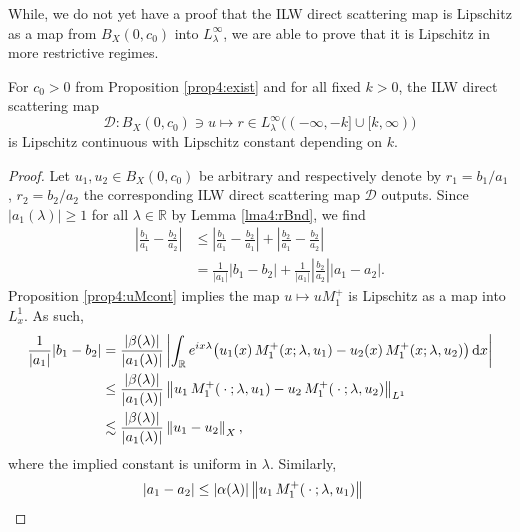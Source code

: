 \documentclass[../dissertation.tex]{subfiles}
\begin{document}
While, we do not yet have a proof that the ILW direct
scattering map is Lipschitz as a map from $B_X(0, c_0)$ into 
$L_\lambda^\infty$, we are able to prove that it is Lipschitz in 
more restrictive regimes.  


\begin{thm}\label{thm4:DlipR}
	For $c_0>0$ from Proposition \ref{prop4:exist} and for all fixed 
	$k > 0$, the ILW direct scattering map 
	\[
		\mathscr D: B_X(0, c_0) \ni u \mapsto r \in
			L_\lambda^\infty\big((-\infty,-k]\cup[k,\infty)\big)
	\] 
	is Lipschitz continuous with Lipschitz constant depending on $k$. 
\end{thm}
\begin{proof}
	Let $u_1, u_2 \in B_X(0, c_0)$ be arbitrary and respectively denote by 
	$r_1 = b_1 / a_1$, $r_2 = b_2 / a_2$ the corresponding ILW direct scattering
	map $\mathscr D$ outputs. Since $|a_1(\lambda)| \geq 1$ for all $\lambda \in \mathbb R$
	by Lemma \ref{lma4:rBnd}, we find 
	\begin{align}\label{eq4:DlipPnT}
		\left| \frac{b_1}{a_1} - \frac{b_2}{a_2} \right|
			&\leq \left|\frac{b_1}{a_1} - \frac{b_2}{a_1}\right|
				+ \left|\frac{b_2}{a_1} - \frac{b_2}{a_2}\right| \\
			&= \frac{1}{|a_1|} |b_1 - b_2| 
				+ \frac{1}{|a_1|} 
					\left|\frac{b_2}{a_2}\right| 
					\left| a_1 - a_2 \right|.
					\nonumber
	\end{align}
	Proposition \ref{prop4:uMcont} implies the map $u \mapsto uM_1^+$ is Lipschitz as a map
	into $L^1_x$. As such, 
	\begin{align}\label{eq4:DlipB}
		\frac{1}{|a_1|} |b_1 - b_2| 
			&= \frac{|\beta(\lambda)|}{|a_1(\lambda)|}
				\left|
					\int_{\mathbb R} 
						e^{ix\lambda} 
						\big(
							u_1(x) \, M_1^+( x; \lambda, u_1) 
								- u_2(x) \, M_1^+( x; \lambda, u_2) 
						\big)
					\, \mathrm{d}x
				\right| \\
			&\leq 
				\frac{|\beta(\lambda)|}{|a_1(\lambda)|} 
				\left\| 
					u_1\, M_1^+(\kern 0.5ex \cdot \kern 0.5ex; \lambda, u_1) 
					- u_2\, M_1^+(\kern 0.5ex \cdot \kern 0.5ex; \lambda, u_2)
				 \right\|_{L^1} 
				\nonumber \\
			&\lesssim 
				\frac{|\beta(\lambda)|}{|a_1(\lambda)|}
				\left\| u_1 - u_2 \right\|_X,
				\nonumber 
	\end{align}
	where the implied constant is uniform in $\lambda$. Similarly,
	\begin{align}\label{eq4:DlipA}
		|a_1 - a_2|
			& \leq 
				|\alpha(\lambda)|
				\left\| 
					u_1 \, M_1^+(\kern 0.5ex \cdot \kern 0.5ex; \lambda, u_1) 
 \right\|
\end{align}
\end{proof}
\end{document}
